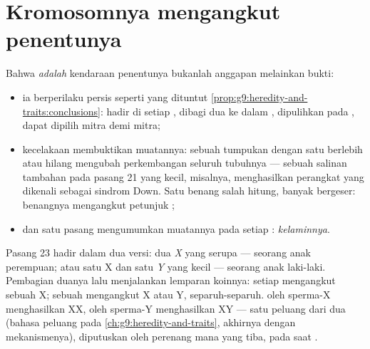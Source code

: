\section{Kromosomnya mengangkut penentunya}

\begin{proposition}\label{prop:g9:chromosomes:evidence}
Bahwa  \emph{adalah} kendaraan penentunya
bukanlah anggapan melainkan bukti:
\begin{itemize}
  \item ia berperilaku persis seperti yang dituntut
        \cref{prop:g9:heredity-and-traits:conclusions}:
        hadir di setiap , dibagi dua ke dalam ,
        dipulihkan pada , dapat dipilih mitra
        demi mitra;
  \item kecelakaan  membuktikan muatannya:
        sebuah tumpukan dengan satu  berlebih atau
        hilang mengubah perkembangan seluruh tubuhnya ---
        sebuah salinan tambahan pada pasang 21 yang kecil,
        misalnya, menghasilkan perangkat  yang dikenali
        sebagai sindrom Down. Satu benang salah hitung,
        banyak  bergeser: benangnya mengangkut petunjuk
        ;
  \item dan satu pasang mengumumkan muatannya pada setiap
        : \emph{ kelaminnya}.
\end{itemize}
\end{proposition}
\admitted

\begin{definition}\label{def:g9:chromosomes:xy}
Pasang 23 hadir dalam dua versi: dua  \emph{X} yang
serupa ---  seorang anak perempuan; atau satu X dan
satu \emph{Y} yang kecil --- seorang anak laki-laki.
Pembagian duanya lalu menjalankan lemparan koinnya: setiap
 mengangkut sebuah X; sebuah  mengangkut
X atau Y, separuh-separuh.  oleh sperma-X
menghasilkan XX, oleh sperma-Y menghasilkan XY --- satu
peluang dari dua (bahasa peluang pada
\cref{ch:g9:heredity-and-traits}, akhirnya dengan
mekanismenya), diputuskan oleh perenang mana yang tiba,
pada saat .
\end{definition}

